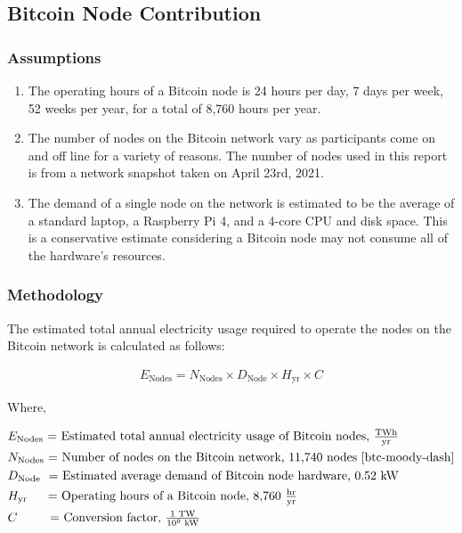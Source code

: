\subsection{Bitcoin Node Contribution}\label{sec:btc-nodes}
\subsubsection{Assumptions}
\begin{enumerate}
  \item The operating hours of a Bitcoin node is 24 hours per day, 7 days per week, 52 weeks per year, for a total of 8,760 hours per year.
  \item The number of nodes on the Bitcoin network vary as participants come on and off line for a variety of reasons.
    The number of nodes used in this report is from a network snapshot taken on April 23rd, 2021.
  \item The demand of a single node on the network is estimated to be the average of a standard laptop, a Raspberry Pi 4, and a 4-core CPU and disk space.
    This is a conservative estimate considering a Bitcoin node may not consume all of the hardware's resources.
\end{enumerate}

\subsubsection{Methodology}
The estimated total annual electricity usage required to operate the nodes on the Bitcoin network is calculated as follows:

\begin{align}\label{eqn:btc-node-e}
E_\textrm{Nodes} = N_\textrm{Nodes} \times D_\textrm{Node} \times H_\textrm{yr} \times C
\end{align}

\noindent
Where,

\begin{align*}
&E_\textrm{Nodes} \textrm{            = Estimated total annual electricity usage of Bitcoin nodes, $\tfrac{ \textrm{{T}Wh} } { \textrm{yr} }$} \\
&N_\textrm{Nodes} \textrm{\           = Number of nodes on the Bitcoin network, 11,740 nodes \cite{btc-moody-dash}} \\
&D_\textrm{Node}  \textrm{\ \         = Estimated average demand of Bitcoin node hardware, 0.52 kW} \\
&H_\textrm{yr}    \textrm{\quad \ \   = Operating hours of a Bitcoin node, 8,760 $\tfrac{ \textrm{hr} } { \textrm{yr} }$} \\
&C                \textrm{\qquad \ \  = Conversion factor, $\tfrac{1 \textrm{ TW} } { 10^9 \textrm{ kW}}$}
\end{align*}

